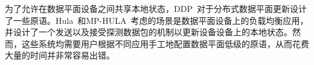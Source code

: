 \documentclass{ctexart}
\begin{document}
为了允许在数据平面设备之间共享本地状态，DDP~\cite{ddp}对于分布式数据平面更新设计了一些原语。Hula~\cite{katta2016hula}和MP-HULA~\cite{benet2018mp}考虑的场景是数据平面设备上的负载均衡应用，并设计了一个发送以及接受探测数据包的机制以更新设备设备上的本地状态。然而，这些系统均需要用户根据不同应用手工地配置数据平面低级的原语，从而花费大量的时间并非常容易出错。

\end{document}
